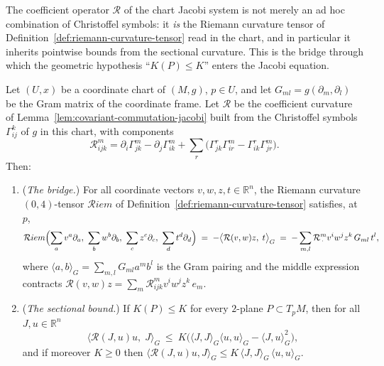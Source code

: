 The coefficient operator ${\mathcal R}$ of the chart Jacobi system is
not merely an ad hoc combination of Christoffel symbols: it {\em is}
the Riemann curvature tensor of
Definition~\ref{def:riemann-curvature-tensor} read in the chart, and
in particular it inherits pointwise bounds from the sectional
curvature. This is the bridge through which the geometric hypothesis
``$K(P)\le K$'' enters the Jacobi equation.

\begin{lemma}
\label{lem:chart-curvature-coordinates}
\leanok



Let $(U,x)$ be a coordinate chart of $(M,g)$, $p\in U$, and let
$G_{ml}=g(\partial_m,\partial_l)$ be the Gram matrix of the
coordinate frame. Let ${\mathcal R}$ be the coefficient curvature of
Lemma~\ref{lem:covariant-commutation-jacobi} built from the
Christoffel symbols $\Gamma^k_{ij}$ of $g$ in this chart, with
components
$${\mathcal R}^m_{ijk}
=\partial_i\Gamma^m_{jk}-\partial_j\Gamma^m_{ik}
+\sum_r\bigl(\Gamma^r_{jk}\Gamma^m_{ir}
-\Gamma^r_{ik}\Gamma^m_{jr}\bigr).$$
Then:
\begin{enumerate}
\item ({\em The bridge.}) For all coordinate vectors
$v,w,z,t\in\mathbb{R}^n$, the Riemann curvature $(0,4)$-tensor
${\mathcal R}iem$ of Definition~\ref{def:riemann-curvature-tensor}
satisfies, at $p$,
$${\mathcal R}iem\Bigl(\sum_a v^a\partial_a,\ \sum_b w^b\partial_b,\
\sum_c z^c\partial_c,\ \sum_d t^d\partial_d\Bigr)
\;=\;-\bigl\langle{\mathcal R}(v,w)z,\;t\bigr\rangle_G
\;=\;-\sum_{m,l}{\mathcal R}^m_{\,\cdot}v^iw^jz^k\,G_{ml}\,t^l,$$
where $\langle a,b\rangle_G=\sum_{m,l}G_{ml}a^mb^l$ is the Gram
pairing and the middle expression contracts
${\mathcal R}(v,w)z=\sum_m{\mathcal R}^m_{ijk}v^iw^jz^k\,e_m$.
\item ({\em The sectional bound.}) If $K(P)\le K$ for every
$2$-plane $P\subset T_pM$, then for all $J,u\in\mathbb{R}^n$
$$\bigl\langle{\mathcal R}(J,u)u,\;J\bigr\rangle_G\ \le\
K\bigl(\langle J,J\rangle_G\langle u,u\rangle_G
-\langle J,u\rangle_G^2\bigr),$$
and if moreover $K\ge0$ then
$\langle{\mathcal R}(J,u)u,J\rangle_G\le
K\,\langle J,J\rangle_G\,\langle u,u\rangle_G$.
\end{enumerate}
\end{lemma}


